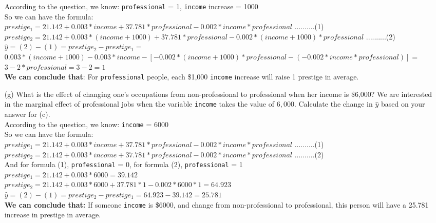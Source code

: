\documentclass[12pt,letterpaper]{article}
\begin{document}
\begin{enumerate}
	According to the question, we know: \texttt{professional} = 1,  \texttt{income} increase = 1000\\
	So we can have the formula: \\
	$prestige_1 =  21.142 + 0.003 * income + 37.781 * professional - 0.002 * income * professional $  ..........(1)\\
	$prestige_2 =  21.142 + 0.003 * (income + 1000) + 37.781 * professional - 0.002 * (income + 1000) * professional $ ..........(2) \\
	
	$\hat{y} = (2) - (1) = prestige_2 - prestige_1 = $ \\ 
	$0.003 * (income + 1000) - 0.003 * income  - [-0.002 * (income + 1000) * professional - (-0.002 * income * professional)] = $ \\
	$ 3 - 2 * professional = 3 - 2 = 1$\\
	
	\textbf{We can conclude that}: For \texttt{professional} people, each \$1,000 \texttt{income} increase will raise 1 prestige in average.
	
	\vspace{.5cm}
	
	\item [(g)]
	What is the effect of changing one's occupations from non-professional to professional when her income is \$6,000? We are interested in the marginal effect of professional jobs when the variable \texttt{income} takes the value of $6,000$. Calculate the change in $\hat{y}$ based on your answer for (c).\\
	
	According to the question, we know: \texttt{income} = 6000 \\
	So we can have the formula:\\
	$prestige_1 =  21.142 + 0.003 * income + 37.781 * professional - 0.002 * income * professional $ ..........(1)\\
	$prestige_2 =  21.142 + 0.003 * income + 37.781 * professional - 0.002 * income * professional $ ..........(2)\\
	
	And for formula (1), \texttt{professional} = 0, for formula (2), \texttt{professional} = 1 \\
	$prestige_1 = 21.142 + 0.003 * 6000 = 39.142$ \\
	$prestige_2 = 21.142 + 0.003 * 6000 + 37.781 * 1 - 0.002 * 6000 * 1 = 64.923$ \\
	
	$\hat{y} = (2) - (1) = prestige_2 - prestige_1 = 64.923 - 39.142 = 25.781$ \\ 
	
	\textbf{We can conclude that:} If someone \texttt{income} is \$6000, and change from non-professional to professional, this person will have a 25.781 increase in prestige in average.

	
\end{enumerate}
\end{document}
